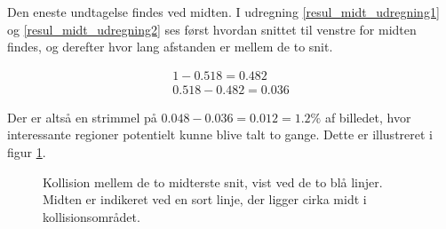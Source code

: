 {Den eneste undtagelse findes ved midten. I udregning
\eqref{resul_midt_udregning1} og \eqref{resul_midt_udregning2} ses først
hvordan snittet til venstre for midten findes, og derefter hvor lang
afstanden er mellem de to snit.

\begin{eqnarray}
    1-0.518 = 0.482\label{resul_midt_udregning1}\\
    0.518-0.482 = 0.036\label{resul_midt_udregning2}
\end{eqnarray}

Der er altså en strimmel på $0.048-0.036 = 0.012 = 1.2\%$ af
billedet, hvor interessante regioner potentielt kunne blive talt to gange.
Dette er illustreret i figur \ref{resultat_fejl_midt}.

\begin{figure}[!h]
	\centering
	\caption{Kollision mellem de to midterste snit, vist ved de to
	blå linjer. Midten er indikeret ved en sort linje, der ligger cirka
	midt i kollisionsområdet.}
	\label{resultat_fejl_midt}
\end{figure}

}
